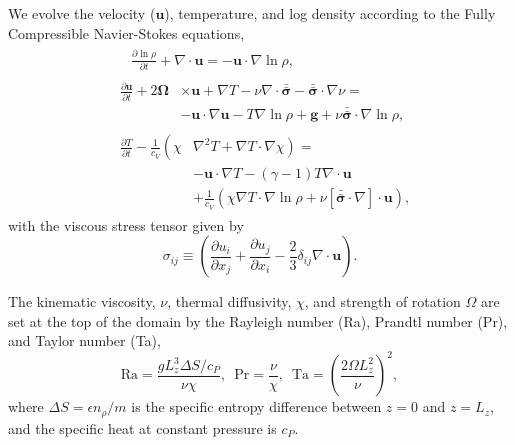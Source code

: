 \documentclass[twocolumn, amsmath, amsfonts, amssymb]{aastex62}
\newcommand{\grad}{\ensuremath{\nabla}}
\newcommand{\lilstressT}{\ensuremath{\bm{\bar{\bar{\sigma}}}}}
\begin{document}
We evolve the velocity ($\bm{u}$), temperature, and log density according to the
Fully Compressible Navier-Stokes equations,
\begin{align}
&\begin{aligned}
&\frac{\partial \ln\rho}{\partial t} + \grad\cdot\bm{u} 
    = -\bm{u}\cdot\grad\ln\rho,
	\label{eqn:continuity_eqn}
\end{aligned}\\
&\begin{aligned}
\frac{\partial\bm{u}}{\partial t} + 2\bm{\Omega}&\times\bm{u} + \grad T - 
\nu\grad\cdot\lilstressT - \lilstressT\cdot\grad\nu = \\
&-\bm{u}\cdot\grad\bm{u} - T\grad\ln\rho + \bm{g} + 
\nu\lilstressT\cdot\grad\ln\rho,
\label{eqn:momentum_eqn}
\end{aligned}\\
&\begin{aligned}
\frac{\partial T}{\partial t} -\frac{1}{c_V}\left(\right.\chi&\left.
    \grad^2 T + \grad T\cdot\grad\chi\right) = \\
	&-\bm{u}\cdot\grad T - (\gamma-1)T\grad\cdot{\bm{u}} \\
	&+ \frac{1}{c_V}\left(\chi\grad T \cdot\grad\ln\rho +
	\nu\left[\lilstressT\cdot\nabla\right]\cdot\bm{u}\right), 
	\label{eqn:energy_eqn}
\end{aligned}
\end{align}
with the viscous stress tensor given by
\begin{equation}
\sigma_{ij} \equiv \left(\frac{\partial u_i}{\partial x_j} + 
\frac{\partial u_j}{\partial x_i} - \frac{2}{3}\delta_{ij}\grad\cdot\bm{u}\right).
	\label{eqn:stress_tensor}
\end{equation}

The kinematic viscosity, $\nu$, thermal diffusivity, $\chi$, and strength of
rotation $\Omega$ are set at the top of the domain by the Rayleigh number
(Ra), Prandtl number (Pr), and Taylor number (Ta),
\begin{equation}
\text{Ra} = \frac{g L_z^3 \Delta S / c_P}{\nu \chi}, \,\,\,
\text{Pr} = \frac{\nu}{\chi}, \,\,\,
\text{Ta} = \left(\frac{2 \Omega L_z^2}{\nu}\right)^2,
\end{equation}
where $\Delta S = \epsilon n_\rho / m$ is the specific entropy difference between
$z = 0$ and $z = L_z$, and the specific heat at constant pressure is $c_P$.
\end{document}
